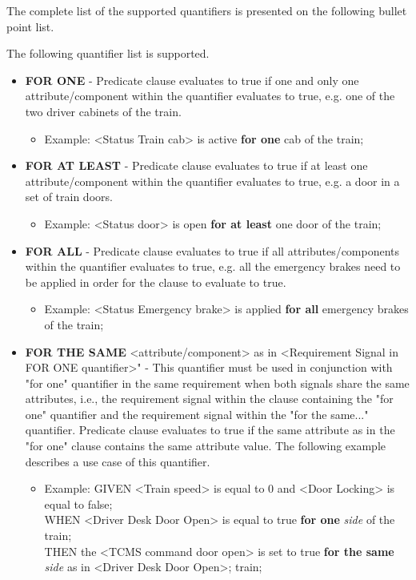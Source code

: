 The complete list of the supported quantifiers is presented on the following bullet point list.

The following quantifier list is supported.
\begin{itemize}
    \item \textbf{FOR ONE} - Predicate clause evaluates to true if one and only one attribute/component within the quantifier evaluates to true, e.g. one of the two driver cabinets of the train.
        \begin{itemize}
            \item Example: <Status Train cab> is active \textbf{for one} cab of the train;\\
        \end{itemize}
    \item \textbf{FOR AT LEAST} - Predicate clause evaluates to true if at least one attribute/component within the quantifier evaluates to true, e.g. a door in a set of train doors.
        \begin{itemize}
            \item Example: <Status door> is open \textbf{for at least} one door of the train;\\
        \end{itemize}
    \item \textbf{FOR ALL} - Predicate clause evaluates to true if all attributes/components within
    the quantifier evaluates to true, e.g. all the emergency brakes need to be applied in order for the clause to evaluate to true.
        \begin{itemize}
            \item Example: <Status Emergency brake> is applied \textbf{for all} emergency brakes of the train;\\
        \end{itemize}
    \item \textbf{FOR THE SAME} <attribute/component> as in <Requirement Signal in FOR ONE quantifier>" - This quantifier must be used in conjunction with "for one" quantifier in the same requirement when both signals share the same attributes, i.e., the requirement signal within the clause containing the "for one" quantifier and the requirement signal within the "for the same..." quantifier. Predicate clause evaluates to true if the same attribute as in the "for one" clause contains the same attribute value. The following example describes a use case of this quantifier.
        \begin{itemize}
            \item Example: GIVEN <Train speed> is equal to 0 and <Door Locking> is equal to false;\\
                           WHEN <Driver Desk Door Open> is equal to true \textbf{for one} \textit{side} of the train;\\
                           THEN the <TCMS command door open> is set to true \textbf{for the same} \textit{side} as in <Driver Desk Door Open>; train;\\
        \end{itemize}
\end{itemize}

